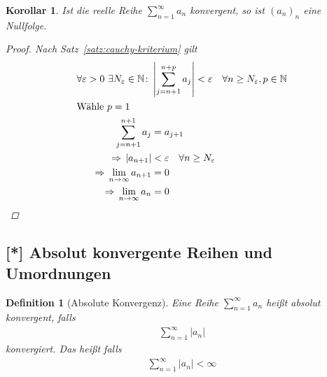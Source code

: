 \documentclass[11pt, twoside, a4paper]{article}
\theoremstyle{plain}
\newtheorem{definition}[blockelement]{Definition}
\newtheorem{korollar}[blockelement]{Korollar}
\newcommand{\abs}[1]{\left\lvert#1\right\rvert}
\newcommand{\impl}[0]{\Rightarrow{}}
\newcommand{\fromto}{\rightarrow{}}
\newcommand{\ntoinf}[0]{n\fromto\infty}
\newcommand{\N}{\mathbb{N}}
\begin{document}
    \begin{korollar} %
        \label{korollar:folge-von-reihe-nullfolge}
        Ist die reelle Reihe $\sum_{n=1}^{\infty} a_n$ konvergent, so ist $(a_n)_n$ eine Nullfolge.
        \begin{proof}
            Nach Satz~\ref{satz:cauchy-kriterium} gilt
            \begin{align*}
                \forall \varepsilon > 0~\exists N_{\varepsilon}\in\N\colon &\abs{\sum_{j=n+1}^{n+p} a_j} < \varepsilon\quad\forall n\geq N_{\varepsilon}, p\in\N\\
                \intertext{Wähle $p=1$}
                \sum_{j=n+1}^{n+1} a_{j} &= a_{j+1}\\
                \impl \abs{a_{n+1}} &< \varepsilon\quad \forall n\geq N_{\varepsilon}\\
                \impl \lim_{\ntoinf} a_{n+1} &= 0\\
                \impl \lim_{\ntoinf} a_{n} &= 0\qedhere
            \end{align*}
        \end{proof}
    \end{korollar}

    \newpage

    \subsection{[*] Absolut konvergente Reihen und Umordnungen}

    \begin{definition}[Absolute Konvergenz] %
        Eine Reihe $\displaystyle\sum_{n=1}^{\infty} a_n$ heißt absolut konvergent, falls
        \begin{align*}
            \sum_{n=1}^{\infty} \abs{a_n}
        \end{align*}
        konvergiert. Das heißt falls
        \begin{align*}
            \sum_{n=1}^{\infty} \abs{a_n} < \infty
        \end{align*}
    \end{definition}
\end{document}
